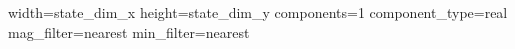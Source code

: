 width={{state_dim_x}}
height={{state_dim_y}}
components=1
component_type=real
mag_filter=nearest
min_filter=nearest
